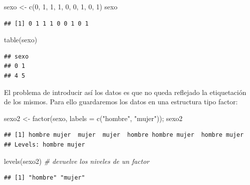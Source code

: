 \documentclass[
]{book}
\newenvironment{Shaded}{\begin{snugshade}}{\end{snugshade}}
\newcommand{\AttributeTok}[1]{\textcolor[rgb]{0.77,0.63,0.00}{#1}}
\newcommand{\CommentTok}[1]{\textcolor[rgb]{0.56,0.35,0.01}{\textit{#1}}}
\newcommand{\DecValTok}[1]{\textcolor[rgb]{0.00,0.00,0.81}{#1}}
\newcommand{\FunctionTok}[1]{\textcolor[rgb]{0.00,0.00,0.00}{#1}}
\newcommand{\NormalTok}[1]{#1}
\newcommand{\OtherTok}[1]{\textcolor[rgb]{0.56,0.35,0.01}{#1}}
\newcommand{\StringTok}[1]{\textcolor[rgb]{0.31,0.60,0.02}{#1}}
\theoremstyle{break}
\begin{document}
\begin{Shaded}
\begin{Highlighting}[]
\NormalTok{sexo }\OtherTok{\textless{}{-}} \FunctionTok{c}\NormalTok{(}\DecValTok{0}\NormalTok{, }\DecValTok{1}\NormalTok{, }\DecValTok{1}\NormalTok{, }\DecValTok{1}\NormalTok{, }\DecValTok{0}\NormalTok{, }\DecValTok{0}\NormalTok{, }\DecValTok{1}\NormalTok{, }\DecValTok{0}\NormalTok{, }\DecValTok{1}\NormalTok{)}
\NormalTok{sexo}
\end{Highlighting}
\end{Shaded}

\begin{verbatim}
## [1] 0 1 1 1 0 0 1 0 1
\end{verbatim}

\begin{Shaded}
\begin{Highlighting}[]
\FunctionTok{table}\NormalTok{(sexo)}
\end{Highlighting}
\end{Shaded}

\begin{verbatim}
## sexo
## 0 1 
## 4 5
\end{verbatim}

El problema de introducir así los datos es que no queda reflejado la
etiquetación de los mismos. Para ello guardaremos los datos en una
estructura tipo factor:

\begin{Shaded}
\begin{Highlighting}[]
\NormalTok{sexo2 }\OtherTok{\textless{}{-}} \FunctionTok{factor}\NormalTok{(sexo, }\AttributeTok{labels =} \FunctionTok{c}\NormalTok{(}\StringTok{"hombre"}\NormalTok{, }\StringTok{"mujer"}\NormalTok{)); sexo2}
\end{Highlighting}
\end{Shaded}

\begin{verbatim}
## [1] hombre mujer  mujer  mujer  hombre hombre mujer  hombre mujer 
## Levels: hombre mujer
\end{verbatim}

\begin{Shaded}
\begin{Highlighting}[]
\FunctionTok{levels}\NormalTok{(sexo2)  }\CommentTok{\# devuelve los niveles de un factor}
\end{Highlighting}
\end{Shaded}

\begin{verbatim}
## [1] "hombre" "mujer"
\end{verbatim}
\end{document}
